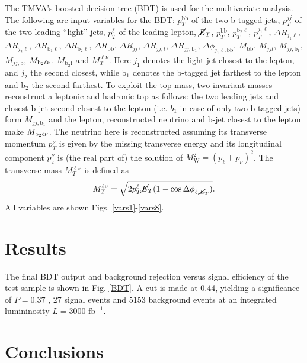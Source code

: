 \documentclass[10pt,a4paper]{article}
\renewcommand{\b}{\text{b}}
\newcommand{\lnu}{\ensuremath{\ell\nu}}
\newcommand{\MET}{\ensuremath{\cancel{\it{E}}_{T}}}
\begin{document}
The TMVA's boosted decision tree (BDT) is used for the multivariate analysis. The following are input variables for the BDT:
$p_T^\text{bb}$ of the two b-tagged jets,
$p_T^{jj}$ of the two leading ``light'' jets,
$p_T^\ell$ of the leading lepton,
\MET,
$p_T^\text{bb}$,
$p_T^{\text{b}_2\ell}$,
$p_T^{j_1\ell}$,
$\Delta R_{j_1\ell}$,
$\Delta R_{j_2\ell}$,
$\Delta R_{\text{b}_1\ell}$,
$\Delta R_{\text{b}_2\ell}$,
$\Delta R_{\b\b}$,
$\Delta R_{jj}$,
$\Delta R_{jj,l}$,
$\Delta R_{jj,\text{b}_1}$,
$\Delta\phi_{j_1\ell\text{,bb}}$,
$M_{\b\b}$,
$M_{jjl}$,
$M_{jj,\text{b}_1}$,
$M_{jj,\text{b}}$,
$M_{\text{b}_2\text{\lnu}}$.
$M_{\text{b}_2\text{\l}}$ and
$M_T^{\ell\nu}$.
Here $j_1$ denotes the light jet closest to the lepton, and $j_2$ the second closest, while $\text{b}_1$ denotes the b-tagged jet farthest to the lepton and $\text{b}_2$ the second farthest.
To exploit the top mass, two invariant masses reconstruct a leptonic and hadronic top as follows: the two leading jets and closest b-jet second closest to the lepton (i.e. $b_1$ in case of only two b-tagged jets) form $M_{jj,\text{b}_1}$ and the lepton, reconstructed neutrino and b-jet closest to the lepton make $M_{\text{b}_2\text{\lnu}}$. The neutrino here is reconstructed assuming its transverse momentum $p^\nu_T$ is given by the missing transverse energy and its longitudinal component $p^\nu_z$ is (the real part of) the solution of $M_\text{W}^2 = (p_\ell + p_\nu)^2$.
The transverse mass $M_T^{\ell\nu}$ is defined as
\begin{equation} \label{MT}
	M_T^{\ell\nu} = \sqrt{ 2 p_T^\ell \text{\MET} ( 1 - \cos \Delta \phi_{\ell,\text{\MET}} )}.
\end{equation}
All variables are shown Figs. \ref{vars1}-\ref{vars8}.




\section{Results}

The final BDT output and background rejection versus signal efficiency of the test sample is shown in Fig. \ref{BDT}. A cut is made at 0.44, yielding a significance of $P=0.37$ %
, 27 signal events and 5153 background events at an integrated lumininosity $L = 3000 \text{ fb}^{-1}$.




\section{Conclusions}
\end{document}
